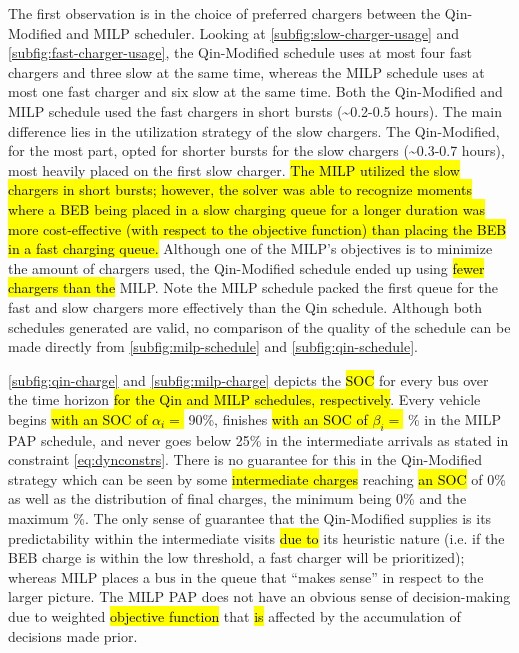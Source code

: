 \documentclass[utf8]{FrontiersinHarvard}
\newcommand{\bcharge}{0.7 }                                                     %
\newcommand{\mincharge}{25\% }                                                  %
\newcommand{\batsize}{388 }                                                     %
\begin{document}
The first observation is in the choice of preferred chargers between the Qin-Modified and MILP scheduler. Looking at
\autoref{subfig:slow-charger-usage} and \autoref{subfig:fast-charger-usage}, the Qin-Modified schedule uses at most four
fast chargers and three slow at the same time, whereas the MILP schedule uses at most one fast charger and six slow at
the same time. Both the Qin-Modified and MILP schedule used the fast chargers in short bursts (\textasciitilde{}0.2-0.5 hours). The main
difference lies in the utilization strategy of the slow chargers. The Qin-Modified, for the most part, opted for shorter
bursts for the slow chargers (\textasciitilde{}0.3-0.7 hours), most heavily placed on the first slow charger. \hl{The MILP utilized the slow chargers in short bursts; however, the solver was able to recognize moments where a BEB being placed in a slow charging queue for a longer duration was more cost-effective (with respect to the objective function) than placing the BEB in a fast charging queue.} Although one of the MILP's objectives is to minimize the amount of chargers
used, the Qin-Modified schedule ended up using \hl{fewer chargers than the} MILP. Note the MILP schedule
packed the first queue for the fast and slow chargers more effectively than the Qin schedule. Although both schedules
generated are valid, no comparison of the quality of the schedule can be made directly from
\autoref{subfig:milp-schedule} and \autoref{subfig:qin-schedule}.

\autoref{subfig:qin-charge} and \autoref{subfig:milp-charge} depicts the \hl{SOC} for every bus over the time
horizon \hl{for the Qin and MILP schedules, respectively}. Every vehicle begins \hl{with an SOC of $\alpha_i = $} 90\%, finishes \hl{with an SOC of $\beta_i =$} \fpeval{\bcharge *100}\% in the MILP PAP schedule, and
never goes below \mincharge in the intermediate arrivals as stated in constraint \autoref{eq:dynconstrs}. There is no
guarantee for this in the Qin-Modified strategy which can be seen by some \hl{intermediate charges} reaching
\hl{an SOC} of 0\% as well as the distribution of final charges, the minimum being 0\% and the maximum
\fpeval{trunc(\fpeval{368 / \batsize * 100}, 3)}\%. The only sense of guarantee that the Qin-Modified supplies
is its predictability within the intermediate visits \hl{due to} its heuristic nature (i.e. if the BEB charge
is within the low threshold, a fast charger will be prioritized); whereas MILP places a bus in the queue that ``makes
sense'' in respect to the larger picture. The MILP PAP does not have an obvious sense of decision-making due to weighted
\hl{objective function} that \hl{is} affected by the accumulation of decisions made prior.
\end{document}
